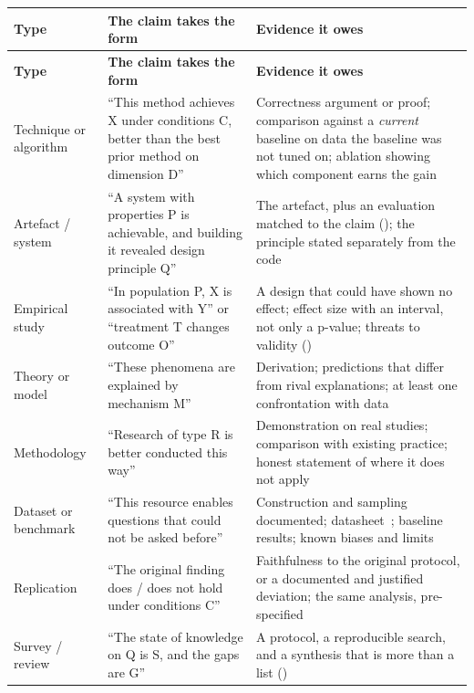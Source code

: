 \begin{center}
\small
\begin{longtable}{@{}L{3.0cm}L{5.2cm}L{6.0cm}@{}}
\toprule
\textbf{Type} & \textbf{The claim takes the form} & \textbf{Evidence it owes} \\
\midrule
\endfirsthead
\toprule
\textbf{Type} & \textbf{The claim takes the form} & \textbf{Evidence it owes} \\
\midrule
\endhead
\bottomrule
\endfoot
Technique or algorithm
  & ``This method achieves X under conditions C, better than the best prior
     method on dimension D''
  & Correctness argument or proof; comparison against a \emph{current} baseline
    on data the baseline was not tuned on; ablation showing which component
    earns the gain \\
Artefact / system
  & ``A system with properties P is achievable, and building it revealed
     design principle Q''
  & The artefact, plus an evaluation matched to the claim
    (); the principle stated separately from the code \\
Empirical study
  & ``In population P, X is associated with Y'' or ``treatment T changes
     outcome O''
  & A design that could have shown no effect; effect size with an interval,
    not only a p-value; threats to validity () \\
Theory or model
  & ``These phenomena are explained by mechanism M''
  & Derivation; predictions that differ from rival explanations; at least one
    confrontation with data \\
Methodology
  & ``Research of type R is better conducted this way''
  & Demonstration on real studies; comparison with existing practice; honest
    statement of where it does not apply \\
Dataset or benchmark
  & ``This resource enables questions that could not be asked before''
  & Construction and sampling documented; datasheet~\cite{gebru2021datasheets};
    baseline results; known biases and limits \\
Replication
  & ``The original finding does / does not hold under conditions C''
  & Faithfulness to the original protocol, or a documented and justified
    deviation; the same analysis, pre-specified \\
Survey / review
  & ``The state of knowledge on Q is S, and the gaps are G''
  & A protocol, a reproducible search, and a synthesis that is more than a
    list () \\
\end{longtable}
\end{center}

